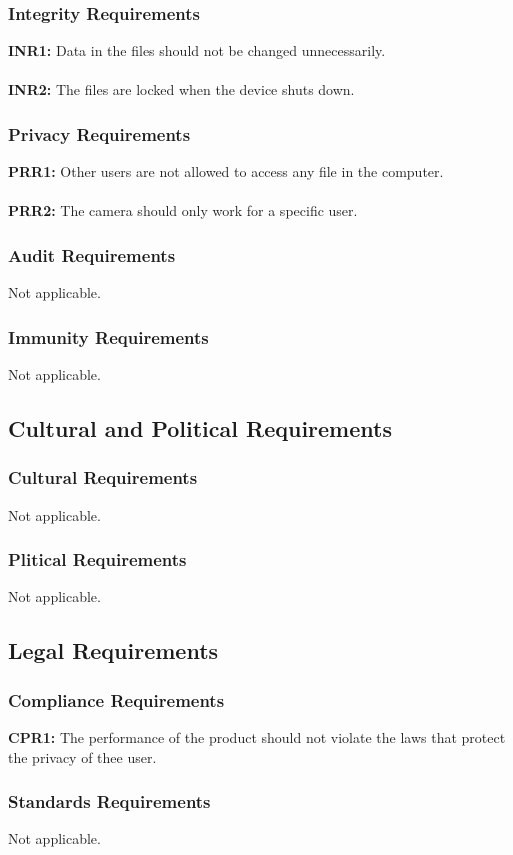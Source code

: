 \documentclass[12pt]{article}
\begin{document}
\subsubsection{Integrity Requirements}
\textbf{INR1:} Data in the files should not be changed unnecessarily.\\\\
\textbf{INR2:} The files are locked when the device shuts down.
\subsubsection{Privacy Requirements}
\textbf{PRR1:} Other users are not allowed to access any file in the computer.\\\\
\textbf{PRR2:} The camera should only work for a specific user.
\subsubsection{Audit Requirements}
Not applicable.
\subsubsection{Immunity Requirements}
Not applicable.
\subsection{Cultural and Political Requirements}
\subsubsection{Cultural Requirements}
Not applicable.
\subsubsection{Plitical Requirements}
Not applicable.
\subsection{Legal Requirements}
\subsubsection{Compliance Requirements}
\textbf{CPR1:} The performance of the product should not violate the laws that protect the privacy of thee user.
\subsubsection{Standards Requirements}
Not applicable.
\end{document}
